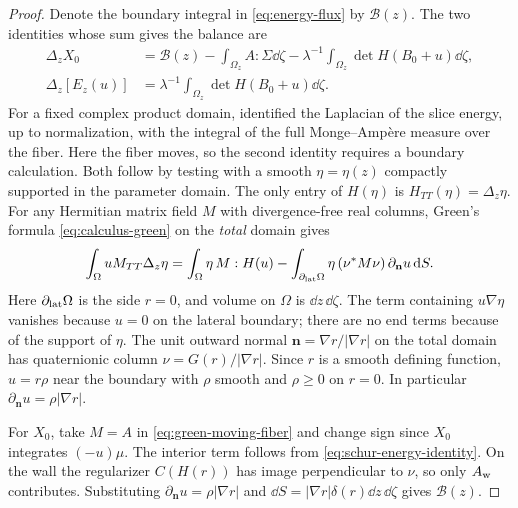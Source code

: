 \begin{proof}
Denote the boundary integral in \eqref{eq:energy-flux} by
$\mathcal B(z)$. The two identities whose sum gives the balance are
\begin{align*}
  \Delta_zX_0
      &=\mathcal B(z)-\int_{\Omega_z}A:\Sigma\dd\zeta
                       -\lambda^{-1}\int_{\Omega_z}\det H(B_0+u)\dd\zeta,\\
  \Delta_z[E_z(u)]
      &=\lambda^{-1}\int_{\Omega_z}\det H(B_0+u)\dd\zeta .
\end{align*}
For a fixed complex product domain, \citet[Theorem~3.1]{AhagEtAl2009}
identified the Laplacian of the slice energy, up to normalization,
with the integral of the full Monge--Ampère measure over the fiber.
Here the fiber moves, so the second identity requires a boundary calculation.
Both follow by testing with a smooth $\eta=\eta(z)$ compactly supported in the
parameter domain. The only entry of $H(\eta)$ is
$H_{TT}(\eta)=\Delta_z\eta$. For any Hermitian matrix field $M$ with
divergence-free real columns, Green's formula \eqref{eq:calculus-green}
on the \emph{total} domain gives
\begin{equation}\label{eq:green-moving-fiber}
 \int_\Omega u M_{TT}\Delta_z\eta
 =\int_\Omega \eta\,M:H(u)
   -\int_{\partial_{\rm lat}\Omega}
       \eta\,(\nu^*M\nu)\,\partial_{\mathbf n}u\,\mathrm d S .
\end{equation}
Here $\partial_{\rm lat}\Omega$ is the side $r=0$, and volume on
$\Omega$ is $\dd z\,\dd\zeta$. The term containing
$u\nabla\eta$ vanishes because $u=0$ on the lateral boundary; there
are no end terms because of the support of $\eta$. The unit outward
normal $\mathbf n=\nabla r/|\nabla r|$ on the total domain has quaternionic
column $\nu=G(r)/|\nabla r|$. Since $r$ is a smooth defining function,
$u=r\rho$ near the boundary with $\rho$ smooth and $\rho\ge0$ on $r=0$.
In particular $\partial_{\mathbf n}u=\rho|\nabla r|$.

For $X_0$, take $M=A$ in \eqref{eq:green-moving-fiber} and change
sign since $X_0$ integrates $(-u)\mu$. The interior term follows
from \eqref{eq:schur-energy-identity}. On the wall the regularizer
$C(H(r))$ has image perpendicular to $\nu$, so only $A_{\rm w}$
contributes. Substituting $\partial_{\mathbf n}u=\rho|\nabla r|$ and
$\dd S=|\nabla r|\delta(r)\dd z\,\dd\zeta$ gives $\mathcal B(z)$.


\end{proof}

